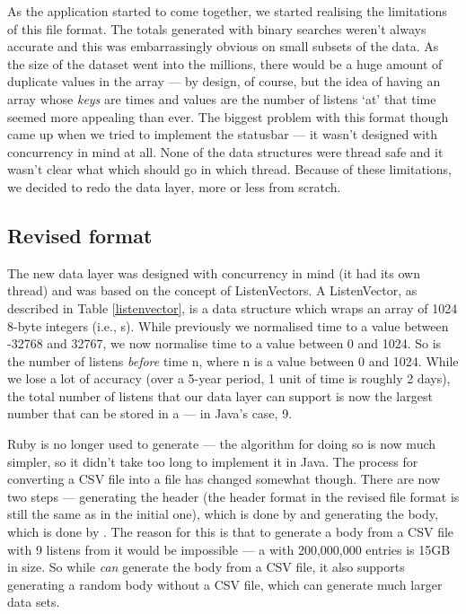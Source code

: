 As the application started to come together, we started realising the limitations of this file format. The totals generated with binary searches weren't always accurate and this was embarrassingly obvious on small subsets of the data. As the size of the dataset went into the millions, there would be a huge amount of duplicate values in the  array --- by design, of course, but the idea of having an array whose \emph{keys} are times and values are the number of listens `at' that time seemed more appealing than ever. The biggest problem with this format though came up when we tried to implement the statusbar --- it wasn't designed with concurrency in mind at all. None of the data structures were thread safe and it wasn't clear what which should go in which thread. Because of these limitations, we decided to redo the data layer, more or less from scratch.

\subsection{Revised format}
The new data layer was designed with concurrency in mind (it had its own thread) and was based on the concept of ListenVectors.\cite{newdata} A ListenVector, as described in Table \ref{listenvector}, is a data structure which wraps an array of 1024 8-byte integers (i.e., s). While previously we normalised time to a value between -32768 and 32767, we now normalise time to a value between 0 and 1024. So  is the number of listens \emph{before} time n, where n is a value between 0 and 1024. While we lose a lot of accuracy (over a 5-year period, 1 unit of time is roughly 2 days), the total number of listens that our data layer can support is now the largest number that can be stored in a  --- in Java's case, 9.

Ruby is no longer used to generate  --- the algorithm for doing so is now much simpler, so it didn't take too long to implement it in Java. The process for converting a CSV file into a  file has changed somewhat though. There are now two steps --- generating the header (the header format in the revised file format is still the same as in the initial one), which is done by \cite{header} and generating the body, which is done by \cite{body}. The reason for this is that to generate a body from a CSV file with 9 listens from it would be impossible --- a  with 200,000,000 entries is 15GB in size. So while  \emph{can} generate the body from a CSV file, it also supports generating a random body without a CSV file, which can generate much larger data sets.












